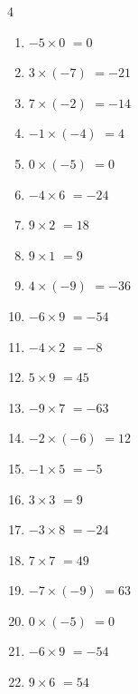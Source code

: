 \begin{multicols}{4}
\begin{enumerate}
  \item $-5\times 0$
        $=0$

  \item $3\times (-7)$
        $=-21$

  \item $7\times (-2)$
        $=-14$

  \item $-1\times (-4)$
        $=4$

  \item $0\times (-5)$
        $=0$

  \item $-4\times 6$
        $=-24$

  \item $9\times 2$
        $=18$

  \item $9\times 1$
        $=9$

  \item $4\times (-9)$
        $=-36$

  \item $-6\times 9$
        $=-54$

  \item $-4\times 2$
        $=-8$

\columnbreak %

  \item $5\times 9$
        $=45$

  \item $-9\times 7$
        $=-63$

  \item $-2\times (-6)$
        $=12$

  \item $-1\times 5$
        $=-5$

  \item $3\times 3$
        $=9$

  \item $-3\times 8$
        $=-24$

  \item $7\times 7$
        $=49$

  \item $-7\times (-9)$
        $=63$

  \item $0\times (-5)$
        $=0$

  \item $-6\times 9$
        $=-54$

  \item $9\times 6$
        $=54$


\end{enumerate}
\end{multicols}
